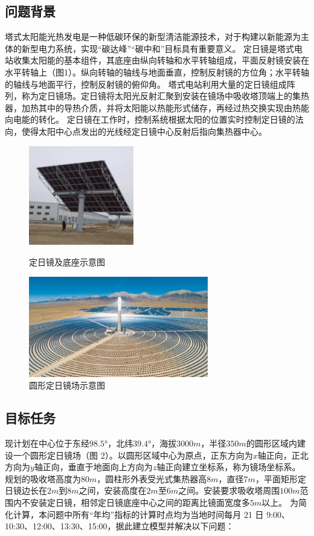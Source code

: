 \documentclass{article}
\numberwithin{equation}{subsection}
\begin{document}
\subsection{问题背景}
塔式太阳能光热发电是一种低碳环保的新型清洁能源技术，对于构建以新能源为主体的新型电力系统，实现“碳达峰”“碳中和”目标具有重要意义。
定日镜是塔式电站收集太阳能的基本组件，其底座由纵向转轴和水平转轴组成，平面反射镜安装在水平转轴上（图1）。纵向转轴的轴线与地面垂直，控制反射镜的方位角；水平转轴的轴线与地面平行，控制反射镜的俯仰角。
塔式电站利用大量的定日镜组成阵列，称为定日镜场。定日镜将太阳光反射汇聚到安装在镜场中吸收塔顶端上的集热器，加热其中的导热介质，并将太阳能以热能形式储存，再经过热交换实现由热能向电能的转化。
定日镜在工作时，控制系统根据太阳的位置实时控制定日镜的法向，使得太阳中心点发出的光线经定日镜中心反射后指向集热器中心。
\begin{figure}[htbp]
	\begin{minipage}{0.4\linewidth}
		\centering
		\includegraphics[width=1.8in]{定日镜及底座示意图.png}
		\caption{定日镜及底座示意图}
	\end{minipage}
	\begin{minipage}{0.5\linewidth}
		\centering
		\includegraphics[width=3.08in]{圆形定日镜场示意图.png}
		\caption{圆形定日镜场示意图}
	\end{minipage}
\end{figure}

\subsection{目标任务}
现计划在中心位于东经$98.5°$，北纬$39.4°$，海拔$3000m$，半径$350m$的圆形区域内建设一个圆形定日镜场（图 2）。以圆形区域中心为原点，正东方向为$x$轴正向，正北方向为$y$轴正向，垂直于地面向上方向为$z$轴正向建立坐标系，称为镜场坐标系。
规划的吸收塔高度为$80m$，圆柱形外表受光式集热器高$8m$，直径$7m$，平面矩形定日镜边长在$2m$到$8m$之间，安装高度在$2m$至$6m$之间。安装要求吸收塔周围$100m$范围内不安装定日镜，相邻定日镜底座中心之间的距离比镜面宽度多$5m$以上。
为简化计算，本问题中所有“年均”指标的计算时点均为当地时间每月 21 日 9:00、10:30、12:00、13:30、15:00，据此建立模型并解决以下问题：
\end{document}
